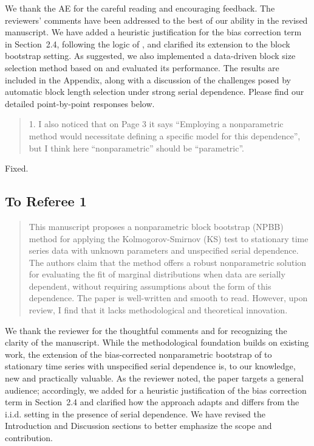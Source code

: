 \documentclass[12pt]{article}
\newenvironment{comment}%
{\begin{quotation}\noindent\small\it\color{darkblue}\ignorespaces%
}{\end{quotation}}
\begin{document}
We thank the AE for the careful reading and encouraging feedback. The
reviewers’ comments have been addressed to the best of our ability in
the revised manuscript. We have added a heuristic justification for
the bias correction term in Section~2.4, following the logic of
\citet{babu2004goodness}, and clarified its extension to the block
bootstrap setting. As suggested, we also implemented a data-driven
block size selection method based on \citet{politis2004automatic} and
evaluated its performance. The results are included in the Appendix,
along with a discussion of the challenges posed by automatic block
length selection under strong serial dependence. Please find our
detailed point-by-point responses below.

\begin{comment}
1. I also noticed that on Page 3 it says “Employing a nonparametric method would necessitate defining a specific model for this dependence”, but I think here “nonparametric” should be “parametric”.
\end{comment}

Fixed.


\subsection*{To Referee 1}

\begin{comment}
This manuscript proposes a nonparametric block bootstrap (NPBB) method for applying the
Kolmogorov-Smirnov (KS) test to stationary time series data with unknown parameters and unspecified serial dependence. The authors claim that the method offers a robust nonparametric solution for evaluating the fit of marginal distributions when data are serially dependent, without
requiring assumptions about the form of this dependence. The paper is well-written and smooth
to read. However, upon review, I find that it lacks methodological and theoretical innovation.
\end{comment}


We thank the reviewer for the thoughtful comments and for recognizing
the clarity of the manuscript. While the methodological foundation
builds on existing work, the extension of the bias-corrected
nonparametric bootstrap of \citet{babu2004goodness} to stationary time
series with unspecified serial dependence is, to our knowledge, new
and practically valuable. As the reviewer noted, the paper targets a
general audience; accordingly, we added for a heuristic justification
of the bias correction term in Section~2.4 and clarified how the
approach adapts and differs from the i.i.d. setting in the presence of
serial dependence. We have revised the Introduction and Discussion
sections to better emphasize the scope and contribution.
\end{document}
